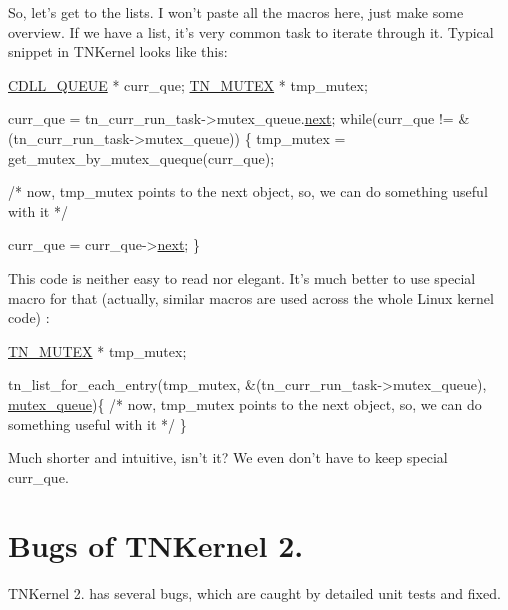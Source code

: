 So, let's get to the lists. I won't paste all the macros here, just make some overview. If we have a list, it's very common task to iterate through it. Typical snippet in T\+N\+Kernel looks like this\+:


\begin{DoxyCode}
\hyperlink{structTN__ListItem}{CDLL\_QUEUE} * curr\_que;
\hyperlink{structTN__Mutex}{TN\_MUTEX} * tmp\_mutex;

curr\_que = tn\_curr\_run\_task->mutex\_queue.\hyperlink{structTN__ListItem_a66648d1a9069530836c3fd738b03ab96}{next};
\textcolor{keywordflow}{while}(curr\_que != &(tn\_curr\_run\_task->mutex\_queue))
\{
   tmp\_mutex = get\_mutex\_by\_mutex\_queque(curr\_que);

   \textcolor{comment}{/* now, tmp\_mutex points to the next object, so,}
\textcolor{comment}{      we can do something useful with it */}

   curr\_que = curr\_que->\hyperlink{structTN__ListItem_a66648d1a9069530836c3fd738b03ab96}{next};
\}
\end{DoxyCode}


This code is neither easy to read nor elegant. It's much better to use special macro for that (actually, similar macros are used across the whole Linux kernel code) \+:


\begin{DoxyCode}
\hyperlink{structTN__Mutex}{TN\_MUTEX} * tmp\_mutex;

tn\_list\_for\_each\_entry(tmp\_mutex, &(tn\_curr\_run\_task->mutex\_queue), \hyperlink{structTN__Task_ad4decd7355c95a5b60a6774c3ee19eb9}{mutex\_queue})\{
   \textcolor{comment}{/* now, tmp\_mutex points to the next object, so,}
\textcolor{comment}{      we can do something useful with it */}
\}
\end{DoxyCode}


Much shorter and intuitive, isn't it? We even don't have to keep special {\ttfamily curr\+\_\+que}.\hypertarget{why_reimplement_why_reimplement__bugs}{}\section{Bugs of T\+N\+Kernel 2.}\label{why_reimplement_why_reimplement__bugs}
T\+N\+Kernel 2. has several bugs, which are caught by detailed unit tests and fixed.


